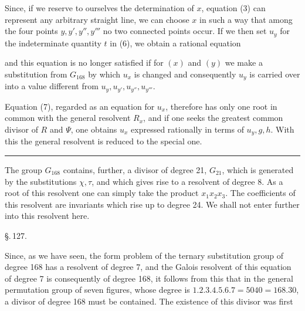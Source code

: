 Since, if we reserve to ourselves the determination of $x$, equation (3) can represent any arbitrary straight line, we can choose $x$ in such a way that among the four points $y, y', y'', y'''$ no two connected points occur. If we then set $u_y$ for the indeterminate quantity $t$ in (6), we obtain a rational equation


and this equation is no longer satisfied if for $(x)$ and $(y)$ we make a substitution from $G_{168}$ by which $u_x$ is changed and consequently $u_y$ is carried over into a value different from $u_y, u_{y'}, u_{y''}, u_{y'''}$.

Equation (7), regarded as an equation for $u_x$, therefore has only one root in common with the general resolvent $R_x$, and if one seeks the greatest common divisor of $R$ and $\Psi$, one obtains $u_x$ expressed rationally in terms of $u_y, g, h$. With this the general resolvent is reduced to the special one.

\begin{center}\rule{0.3\linewidth}{0.4pt}\end{center}

The group $G_{168}$ contains, further, a divisor of degree 21, $G_{21}$, which is generated by the substitutions $\chi, \tau$, and which gives rise to a resolvent of degree 8. As a root of this resolvent one can simply take the product $x_1 x_2 x_3$. The coefficients of this resolvent are invariants which rise up to degree 24. We shall not enter further into this resolvent here.

\begin{center}
\S.\,127.

\end{center}

Since, as we have seen, the form problem of the ternary substitution group of degree 168 has a resolvent of degree 7, and the Galois resolvent of this equation of degree 7 is consequently of degree 168, it follows from this that in the general permutation group of seven figures, whose degree is $1.2.3.4.5.6.7 = 5040 = 168.30$, a divisor of degree 168 must be contained. The existence of this divisor was first

